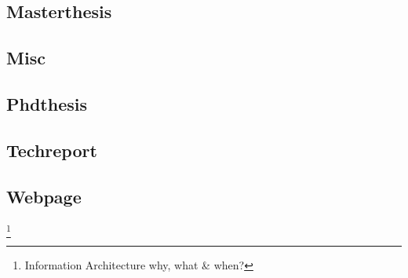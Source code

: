 \subsection{Masterthesis}

\cite{macedo2005}

\subsection{Misc}

\cite{fultz2011}
\cite{limamarques2010}

\subsection{Phdthesis}

\cite{guizzardi2005}

\subsection{Techreport}

\cite{iaea2010}

\subsection{Webpage}

\cite{dillon2000}\footnote{Information Architecture why, what \& when?}
